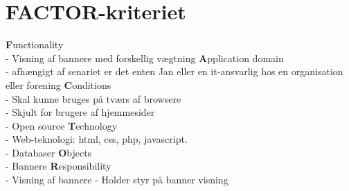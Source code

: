 \documentclass[a4paper,12pt]{article}
\begin{document}
\section{FACTOR-kriteriet}

\large{\bf{F}}\normalsize{unctionality
\\
- Visning af bannere med forskellig vægtning}
\newline
\newline
\large{\bf{A}}\normalsize{pplication domain
\\
- afhængigt af senariet er det enten Jan eller en it-ansvarlig hos en organisation eller forening}
\newline
\newline
\large{\bf{C}}\normalsize{onditions\\
- Skal kunne bruges på tværs af browsere\\
- Skjult for brugere af hjemmesider\\
- Open source}
\newline
\newline
\large{\bf{T}}\normalsize{echnology\\
- Web-teknologi: html, css, php, javascript.\\
- Databaser}
\newline
\newline
\large{\bf{O}}\normalsize{bjects\\
- Bannere}
\newline
\newline
\large{\bf{R}}\normalsize{esponsibility\\
- Visning af bannere
- Holder styr på banner visning}

\newpage
\end{document}

